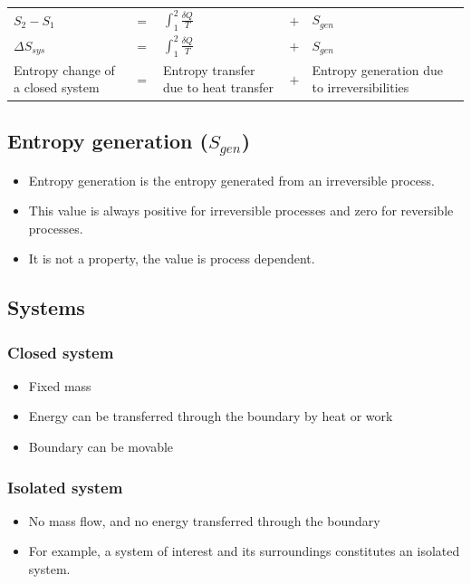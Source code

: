 \documentclass[11pt]{article}
\begin{document}
\begin{tabular}{ >{\centering\arraybackslash}m{10em} >{\centering\arraybackslash}m{1em} >{\centering\arraybackslash}m{10em} >{\centering\arraybackslash}m{1em} >{\centering\arraybackslash}m{10em} }
\(S_2 - S_1\) & \(=\) & \(\int_1^2 \frac{\delta Q}{T}\) & \(+\) & \(S_{gen}\) \\
\(\Delta S_{sys}\) & \(=\) & \(\int_1^2 \frac{\delta Q}{T}\) & \(+\) & \(S_{gen}\) \\
Entropy change of a closed system & \(=\) & Entropy transfer due to heat transfer & \(+\) & Entropy generation due to irreversibilities \\
\end{tabular}

\subsection{Entropy generation (\(S_{gen}\))}
\label{sec:org3880fcf}
\begin{itemize}
\item Entropy generation is the entropy generated from an irreversible process.
\item This value is always positive for irreversible processes and zero for reversible processes.
\item It is not a property, the value is process dependent.
\end{itemize}

\subsection{Systems}
\label{sec:orgc9cec0e}

\subsubsection{Closed system}
\label{sec:org9002e9d}
\begin{itemize}
\item Fixed mass
\item Energy can be transferred through the boundary by heat or work
\item Boundary can be movable
\end{itemize}

\subsubsection{Isolated system}
\label{sec:org4282059}
\begin{itemize}
\item No mass flow, and no energy transferred through the boundary
\item For example, a system of interest and its surroundings constitutes an isolated system.
\end{itemize}
\end{document}
